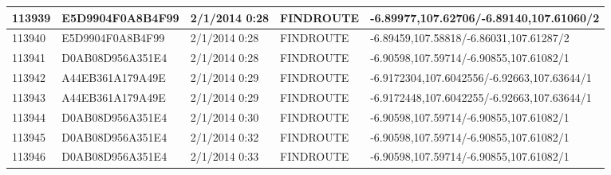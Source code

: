 \begin{longtable}{|p{1cm}|l|l|l|p{8cm}|}
113939         & E5D9904F0A8B4F99 & 2/1/2014 0:28            & FINDROUTE       & -6.89977,107.62706/-6.89140,107.61060/2                                                                                                                                                                               \\ \hline
113940         & E5D9904F0A8B4F99 & 2/1/2014 0:28            & FINDROUTE       & -6.89459,107.58818/-6.86031,107.61287/2                                                                                                                                                                               \\ \hline
113941         & D0AB08D956A351E4 & 2/1/2014 0:28            & FINDROUTE       & -6.90598,107.59714/-6.90855,107.61082/1                                                                                                                                                                               \\ \hline
113942         & A44EB361A179A49E & 2/1/2014 0:29            & FINDROUTE       & -6.9172304,107.6042556/-6.92663,107.63644/1                                                                                                                                                                           \\ \hline
113943         & A44EB361A179A49E & 2/1/2014 0:29            & FINDROUTE       & -6.9172448,107.6042255/-6.92663,107.63644/1                                                                                                                                                                           \\ \hline
113944         & D0AB08D956A351E4 & 2/1/2014 0:30            & FINDROUTE       & -6.90598,107.59714/-6.90855,107.61082/1                                                                                                                                                                               \\ \hline
113945         & D0AB08D956A351E4 & 2/1/2014 0:32            & FINDROUTE       & -6.90598,107.59714/-6.90855,107.61082/1                                                                                                                                                                               \\ \hline
113946         & D0AB08D956A351E4 & 2/1/2014 0:33            & FINDROUTE       & -6.90598,107.59714/-6.90855,107.61082/1                                                                                                                                                                               \\ \hline

\end{longtable}
